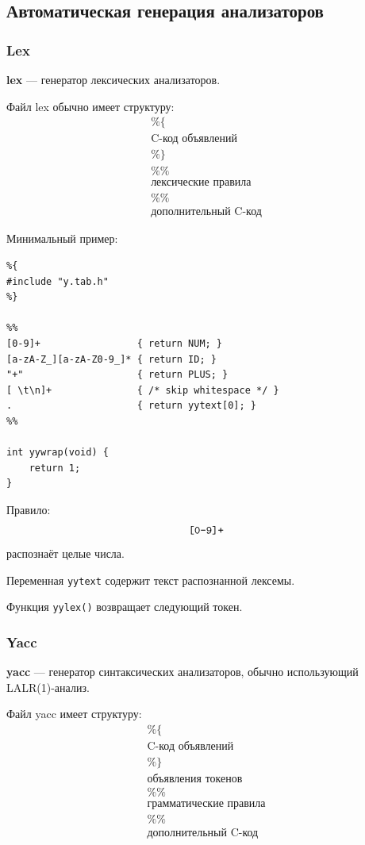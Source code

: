 \documentclass[12pt,a4paper]{article}
\theoremstyle{definition}
\theoremstyle{plain}
\begin{document}
\subsection{Автоматическая генерация анализаторов}

\subsubsection{Lex}

\textbf{lex} --- генератор лексических анализаторов.

Файл lex обычно имеет структуру:
\[
\begin{array}{c}
\%\{\\
\text{C-код объявлений}\\
\%\}\\
\%\%\\
\text{лексические правила}\\
\%\%\\
\text{дополнительный C-код}
\end{array}
\]

Минимальный пример:

\begin{verbatim}
%{
#include "y.tab.h"
%}

%%
[0-9]+                 { return NUM; }
[a-zA-Z_][a-zA-Z0-9_]* { return ID; }
"+"                    { return PLUS; }
[ \t\n]+               { /* skip whitespace */ }
.                      { return yytext[0]; }
%%

int yywrap(void) {
    return 1;
}
\end{verbatim}

Правило:
\[
\text{\texttt{[0-9]+}}
\]
распознаёт целые числа.

Переменная \texttt{yytext} содержит текст распознанной лексемы.

Функция \texttt{yylex()} возвращает следующий токен.

\subsubsection{Yacc}

\textbf{yacc} --- генератор синтаксических анализаторов, обычно использующий LALR(1)-анализ.

Файл yacc имеет структуру:
\[
\begin{array}{c}
\%\{\\
\text{C-код объявлений}\\
\%\}\\
\text{объявления токенов}\\
\%\%\\
\text{грамматические правила}\\
\%\%\\
\text{дополнительный C-код}
\end{array}
\]
\end{document}
